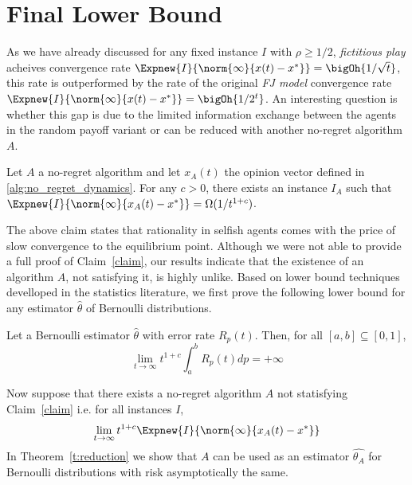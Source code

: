 \section{Final Lower Bound}
As we have already discussed for any fixed instance $I$ with $\rho\geq 1/2$, \emph{fictitious play} acheives convergence rate $\Expnew{I}{\norm{\infty}{x(t)-x^*}}=\bigOh{1/\sqrt{t}}$, this rate is outperformed by
the rate of the original \emph{FJ model} convergence rate $\Expnew{I}{\norm{\infty}{x(t)-x^*}}=\bigOh{1/2^{t}}$. An interesting question is whether this gap
is due to the limited information exchange between the agents in the random payoff variant or can be reduced with another no-regret algorithm $A$.

\begin{claim}\label{claim}
Let $A$ a no-regret algorithm and let $x_A(t)$ the opinion vector defined in \ref{alg:no_regret_dynamics}. 
For any $c>0$, there exists an instance $I_A$ such that $\Expnew{I}{\norm{\infty}{x_A(t)-x^*}} = \Omega(1/t^{1+c})$.
\end{claim}


The above claim states that rationality in selfish agents comes with the price of slow convergence to the equilibrium point.
Although we were not able to provide a full proof of Claim~\ref{claim}, our results indicate that 
the existence of an algorithm $A$, not satisfying it, is highly unlike. Based on lower bound techniques develloped
in the statistics literature, we first prove the following lower bound for any estimator $\hat{\theta}$ of Bernoulli distributions.

\begin{theorem}\label{t:integral}
Let a Bernoulli estimator $\hat{\theta}$ with error rate $R_p(t)$. Then, for all $[a,b] \subseteq [0,1]$,
\[ \lim_{t \to \infty}t^{1+c} \int_{a}^{b}R_p(t)dp = +\infty\]
\end{theorem} 

\noindent Now suppose that there exists a no-regret algorithm $A$ not statisfying Claim~\ref{claim} i.e. for all instances $I$, \[\lim_{t\rightarrow \infty}t^{1+c}\Expnew{I}{\norm{\infty}{x_A(t)-x^*}}\]  
In Theorem~\ref{t:reduction} we show that $A$ can be used as an estimator $\hat{\theta_A}$ for Bernoulli distributions with risk asymptotically the same. 

